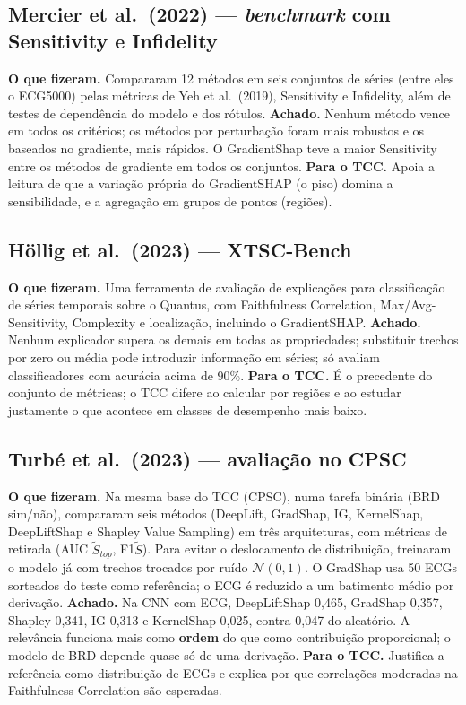 \documentclass[11pt,a4paper]{article}
\begin{document}
\subsection{Mercier et al.\ (2022) — \textit{benchmark} com Sensitivity e Infidelity}
\textbf{O que fizeram.} Compararam 12 métodos em seis conjuntos de séries (entre eles o ECG5000) pelas métricas de Yeh et al.\ (2019), Sensitivity e Infidelity, além de testes de dependência do modelo e dos rótulos. \textbf{Achado.} Nenhum método vence em todos os critérios; os métodos por perturbação foram mais robustos e os baseados no gradiente, mais rápidos. O GradientShap teve a maior Sensitivity entre os métodos de gradiente em todos os conjuntos. \textbf{Para o TCC.} Apoia a leitura de que a variação própria do GradientSHAP (o piso) domina a sensibilidade, e a agregação em grupos de pontos (regiões).

\subsection{Höllig et al.\ (2023) — XTSC-Bench}
\textbf{O que fizeram.} Uma ferramenta de avaliação de explicações para classificação de séries temporais sobre o Quantus, com Faithfulness Correlation, Max/Avg-Sensitivity, Complexity e localização, incluindo o GradientSHAP. \textbf{Achado.} Nenhum explicador supera os demais em todas as propriedades; substituir trechos por zero ou média pode introduzir informação em séries; só avaliam classificadores com acurácia acima de 90\%. \textbf{Para o TCC.} É o precedente do conjunto de métricas; o TCC difere ao calcular por regiões e ao estudar justamente o que acontece em classes de desempenho mais baixo.

\subsection{Turbé et al.\ (2023) — avaliação no CPSC}
\textbf{O que fizeram.} Na mesma base do TCC (CPSC), numa tarefa binária (BRD sim/não), compararam seis métodos (DeepLift, GradShap, IG, KernelShap, DeepLiftShap e Shapley Value Sampling) em três arquiteturas, com métricas de retirada (AUC $\tilde{S}_{top}$, F1$\tilde{S}$). Para evitar o deslocamento de distribuição, treinaram o modelo já com trechos trocados por ruído $\mathcal{N}(0,1)$. O GradShap usa 50 ECGs sorteados do teste como referência; o ECG é reduzido a um batimento médio por derivação. \textbf{Achado.} Na CNN com ECG, DeepLiftShap 0,465, GradShap 0,357, Shapley 0,341, IG 0,313 e KernelShap 0,025, contra 0,047 do aleatório. A relevância funciona mais como \textbf{ordem} do que como contribuição proporcional; o modelo de BRD depende quase só de uma derivação. \textbf{Para o TCC.} Justifica a referência como distribuição de ECGs e explica por que correlações moderadas na Faithfulness Correlation são esperadas.
\end{document}
